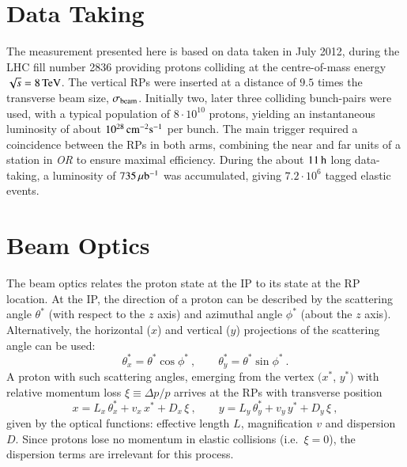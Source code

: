 \section{Data Taking}
\label{sec:data taking}

The measurement presented here is based on data taken in July 2012, during the LHC fill number 2836 providing protons colliding at the centre-of-mass energy $\sqrt s = 8\,{\rm TeV}$. The vertical RPs were inserted at a distance of $9.5$ times the transverse beam size, $\sigma_{\rm beam}$. Initially two, later three colliding bunch-pairs were used, with a typical population of $8\cdot10^{10}$ protons, yielding an instantaneous luminosity of about $10^{28}\,{\rm cm^{-2}s^{-1}}$ per bunch. The main trigger required a coincidence between the RPs in both arms, combining the near and far units of a station in \textit{OR} to ensure maximal efficiency. During the about $11\,{\rm h}$ long data-taking, a luminosity of $735\,{\rm \mu b^{-1}}$ was accumulated, giving $7.2\cdot 10^6$ tagged elastic events.



\section{Beam Optics}
\label{sec:beam optics}

The beam optics relates the proton state at the IP to its state at the RP location. At the IP, the direction of a proton can be described by the scattering angle $\theta^*$ (with respect to the $z$ axis) and azimuthal angle $\phi^*$ (about the $z$ axis). Alternatively, the horizontal ($x$) and vertical ($y$) projections of the scattering angle can be used:
\begin{equation}
\label{eq:scatt angle}
\theta_x^* = \theta^* \cos\phi^*\ ,\qquad \theta_y^* = \theta^* \sin\phi^*\ .
\end{equation}
A proton with such scattering angles, emerging from the vertex $(x^*$, $y^*)$ with relative momentum loss $\xi \equiv \Delta p / p$ arrives at the RPs with transverse position
\begin{equation}
\label{eq:prot trans}
	x = L_x\, \theta_x^* + v_x\, x^* + D_x\, \xi\ ,\qquad y = L_y\, \theta_y^* + v_y\, y^* + D_y\, \xi\ ,
\end{equation}
given by the optical functions: effective length $L$, magnification $v$ and dispersion $D$. Since protons lose no momentum in elastic collisions 
(i.e.~$\xi = 0$), the dispersion terms are irrelevant for this process.

